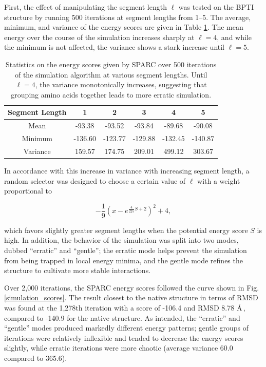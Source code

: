 \documentclass[11pt,titlepage]{article}
\begin{document}
First, the effect of manipulating the segment length $\ell$ was tested on the BPTI structure by running 500 iterations at segment lengths from 1--5.
The average, minimum, and variance of the energy scores are given in Table \ref{segment_length_table}.
The mean energy over the course of the simulation increases sharply at $\ell=4$, and while the minimum is not affected, the variance shows a stark increase until $\ell=5$.

\begin{table}
	\begin{center}
		\begin{tabular}{c c c c c c}
			\toprule
			Segment Length & 1 & 2 & 3 & 4 & 5 \\
			\midrule
			Mean     & -93.38  & -93.52  & -93.84  & -89.68  & -90.08  \\
			Minimum  & -136.60 & -123.77 & -129.88 & -132.45 & -140.87 \\
			Variance & 159.57  & 174.75  & 209.01  & 499.12  & 303.67 \\ 
			\bottomrule
		\end{tabular}
	\end{center}
	\caption{Statistics on the energy scores given by SPARC over 500 iterations of the simulation algorithm at various segment lengths. Until $\ell=4$, the variance monotonically increases, suggesting that grouping amino acids together leads to more erratic simulation.}
	\label{segment_length_table}
\end{table}

In accordance with this increase in variance with increasing segment length, a random selector was designed to choose a certain value of $\ell$ with a weight proportional to

\begin{equation}
-\frac{1}{9}\left(x-e^{\frac{4}{225}S+2}\right)^2+4,
\end{equation}

which favors slightly greater segment lengths when the potential energy score $S$ is high.
In addition, the behavior of the simulation was split into two modes, dubbed ``erratic'' and ``gentle''; the erratic mode helps prevent the simulation from being trapped in local energy minima, and the gentle mode refines the structure to cultivate more stable interactions.

Over 2,000 iterations, the SPARC energy scores followed the curve shown in Fig. \ref{simulation_scores}. 
The result closest to the native structure in terms of RMSD was found at the 1,278th iteration with a score of -106.4 and RMSD 8.78 \AA\,, compared to -140.9 for the native structure.
As intended, the ``erratic'' and ``gentle'' modes produced markedly different energy patterns; gentle groups of iterations were relatively inflexible and tended to decrease the energy scores slightly, while erratic iterations were more chaotic (average variance 60.0 compared to 365.6).
\end{document}
